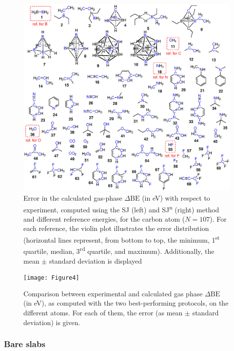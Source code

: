 \documentclass[%
aip,
amsmath,amssymb,
preprint,%
jcp,
showkeys,
]{revtex4-2}
\def\dbe{\ensuremath{\Delta\text{BE}}}
\begin{document}
\begin{figure}
	\centering
	\includegraphics[width=\linewidth]{Figure3}
	\caption{Error in the calculated gas-phase \dbe{}  (in \si{\electronvolt}) with respect to experiment, computed using the SJ (left) and SJ\textsuperscript{n} (right) method and different reference energies, for the carbon atom ($N=107$). For each reference, the violin plot illustrates the error distribution (horizontal lines represent, from bottom to top, the minimum, 1\textsuperscript{st} quartile, median, 3\textsuperscript{rd} quartile, and maximum). Additionally, the mean $\pm$ standard deviation is displayed}
	\label{fig:xps_C185_C}
\end{figure}


\begin{figure}[p]
	\centering
	\texttt{[image: Figure4]}
	\caption{Comparison between experimental and calculated gas phase \dbe{} (in \si{\electronvolt}), as computed with the two best-performing protocols, on the different atoms. For each of them, the error (as mean $\pm$ standard deviation) is given.}
	\label{fig:xps_C185}
\end{figure}

\clearpage

\subsubsection{Bare slabs}
\end{document}

